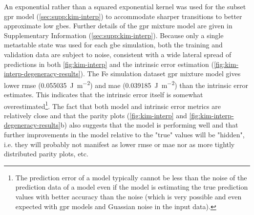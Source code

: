 \documentclass[final,twocolumn,12pt]{elsarticle}
\newcommand{\inpt}{input}
\newcommand{\outpt}{prediction}
\begin{document}
An exponential rather than a squared exponential kernel was used for the subset \gls{gpr} model (\cref{sec:supp:kim-interp}) to accommodate sharper transitions to better approximate low \glspl{gbe}. Further details of the \gls{gpr} mixture model are given in Supplementary Information (\cref{sec:supp:kim-interp}). Because only a single metastable state was used for each \gls{gbe} simulation, both the training and validation data are subject to noise, consistent with a wide lateral spread of predictions in both \cref{fig:kim-interp} and the intrinsic error estimation (\cref{fig:kim-interp-degeneracy-results}). The Fe simulation dataset \gls{gpr} mixture model gives lower \gls{rmse} (\SI{0.055035}{\joule\per\square\meter}) and \gls{mae} (\SI{0.039185}{\joule\per\square\meter}) than the intrinsic error estimates. This indicates that the intrinsic error itself is somewhat overestimated\footnote{The \outpt{} error of a model typically cannot be less than the noise of the \outpt{} data of a model even if the model is estimating the true \outpt{} values with better accuracy than the noise (which is very possible and even expected with \gls{gpr} models and Guassian noise in the \inpt{} data).}. The fact that both model and intrinsic error metrics are relatively close and that the parity plots (\cref{fig:kim-interp} and \cref{fig:kim-interp-degeneracy-results}b) also suggests that the model is performing well and that further improvements in the model relative to the "true" values will be "hidden", i.e. they will probably not manifest as lower \gls{rmse} or \gls{mae} nor as more tightly distributed parity plots, etc.
\end{document}
